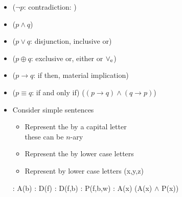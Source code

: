 \documentclass[headrule,footrule]{foils}
\begin{document}
\begin{itemize}
\item {} ($\neg p$: contradiction: )
\item {} ($p \wedge q$)
\item {}  ($p \vee q$: disjunction, inclusive or)
\item {} ($p \oplus q$: exclusive or, either or 
  $\vee_\textnormal{\scriptsize e}$)
\item {} ($p \rightarrow q$: if then, material implication)
\item {} ($p \equiv q$: if and only if) 
  ($(p \rightarrow q) \wedge (q \rightarrow p)$)
\end{itemize}


\begin{itemize}
\item Consider simple sentences
  \begin{itemize}
  \item Represent the  by a capital letter
    \\ these can be $n$-ary
  \item Represent the  by lower case letters
  \item Represent  by lower case letters (x,y,z)
  \end{itemize}
  \begin{exe}
    \ex {}: A(b)
    \ex {}: D(f)
    \ex {}: D(f,b)
    \ex {}: P(f,b,w)
    \ex {}: A(x) \hfill (A(x) $\wedge$ P(x)) 
  \end{exe}
\end{itemize}

\end{document}
